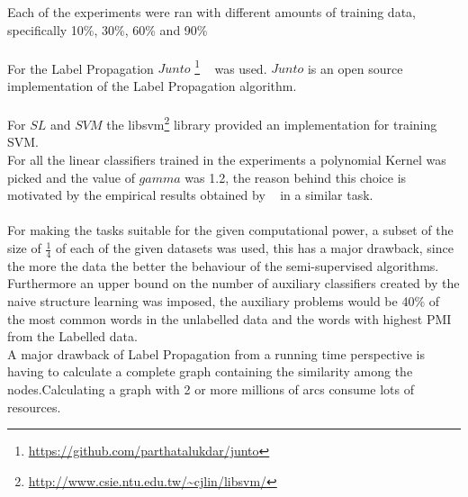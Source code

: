 \documentclass[4pt,a4paper,twocolumn]{article}
\begin{document}
Each of the experiments were ran with different amounts of training data, specifically 10\%, 30\%, 60\% and 90\%\\
\\
For the Label Propagation  $Junto$ \footnote{ \url{https://github.com/parthatalukdar/junto} } ~\cite{Talukdar:2010:EGS:1858681.1858830} was used. $Junto$ is an open source implementation of the Label Propagation algorithm.\\
\\
For $SL$ and $SVM$ the libsvm\footnote{\url{http://www.csie.ntu.edu.tw/~cjlin/libsvm/}} library provided an implementation for training SVM.\\
For all the linear classifiers trained in the experiments a  polynomial Kernel was picked and the value of $gamma$ was 1.2, the reason behind this choice is motivated by the empirical results obtained by ~\cite{Joachims:1998:TCS:645326.649721} in a similar task.\\
\\
For making the tasks suitable for the given computational power, a subset of the size of $\frac{1}{4}$ of each of the given datasets was used, this has a major drawback, since the more the data the better the behaviour of the semi-supervised algorithms.
Furthermore an upper bound on the number of auxiliary classifiers created by  the naive structure learning was imposed, the auxiliary problems would be 40\% of the most common words in the unlabelled data and the words with highest PMI from the Labelled data.\\
A major drawback of Label Propagation from a running time perspective is having to calculate a complete graph containing the similarity among the nodes.Calculating a graph with 2 or more millions of arcs consume lots of resources.
\end{document}
